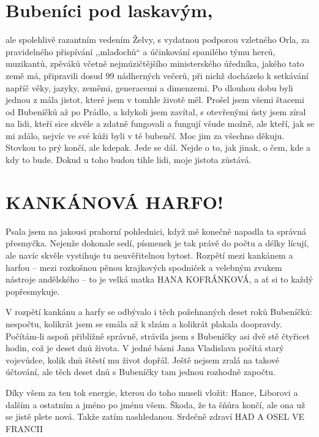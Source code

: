 \bigskip

\section{Bubeníci pod laskavým,}

\noindent
ale spolehlivě razantním vedením Želvy, s vydatnou podporou vzletného Orla, za pravidelného přispívání ,,mlaďochů`` a účinkování spanilého týmu herců, muzikantů, zpěváků včetně nejmúzičtějšího ministerského úředníka, jakého tato země má, připravili dosud 99 nádherných večerů, při nichž docházelo k setkávání napříč věky, jazyky, zeměmi, generacemi a dimenzemi. Po dlouhou dobu byli jednou z mála jistot, které jsem v tomhle životě měl. Prošel jsem všemi štacemi od Bubeníčků až po Prádlo, a kdykoli jsem zavítal, s otevřenými ústy jsem zíral na lidi, kteří sice skvěle a zdatně fungovali a fungují všude možně, ale kteří, jak se mi zdálo, nejvíc ve své kůži byli v té bubenčí. Moc jim za všechno děkuju. Stovkou to prý končí, ale kdepak. Jede se dál. Nejde o to, jak jinak, o čem, kde a kdy to bude. Dokud u toho budou tihle lidi, moje jistota zůstává. 


\bigskip

\section{KANKÁNOVÁ HARFO!}

\noindent
Psala jsem na jakousi prahorní pohlednici, když mě konečně napadla ta správná přesmyčka. Nejenže dokonale sedí, písmenek je tak právě do počtu a délky lícují, ale navíc skvěle vystihuje tu neuvěřitelnou bytost. Rozpětí mezi kankánem a harfou -- mezi rozkošnou pěnou krajkových spodniček a velebným zvukem nástroje andělského -- to je velká matka HANA KOFRÁNKOVÁ, a ať si to každý popřesmykuje. 

V rozpětí kankánu a harfy se odbývalo i těch požehnaných deset roků Bubeníčků: nespočtu, kolikrát jsem se smála až k slzám a kolikrát plakala doopravdy. Počítám-li aspoň přibližně správně, strávila jsem s Bubeníčky asi dvě stě čtyřicet hodin, což je deset dnů života. V jedné básni Jana Vladislava počítá starý vojevůdce, kolik dnů štěstí mu život dopřál. Ještě nejsem zralá na takové účtování, ale těch deset dnů s Bubeníčky tam jednou rozhodně započtu.

Díky všem za ten tok energie, kterou do toho museli vložit: Hance, Liborovi a dalším a ostatním a jméno po jménu všem. Škoda, že ta šňůra končí, ale ona už se jistě  plete nová. Takže zatím nashledanou. Srdečně zdraví HAD A OSEL VE FRANCII 

